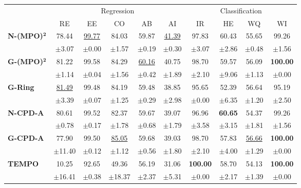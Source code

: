 \begin{table}[ht]
\centering
\small
\begin{tabular}{lccccc cccc}
\toprule
& \multicolumn{5}{c}{Regression}
& \multicolumn{4}{c}{Classification} \\
\cmidrule(r{0.7em}){1-6}
\cmidrule(l{0.7em}){7-10}
& RE & EE & CO & AB & AI & IR & HE & WQ & WI \\
\textbf{N-(MPO)}$\bm{^2}$ & 78.44 & \underline{99.77} & 84.03 & 59.87 & \underline{41.39} & 97.83 & 60.43 & 55.65 & 99.26 \\
 & $\pm$3.07 & $\pm$0.00 & $\pm$1.57 & $\pm$0.19 & $\pm$0.30 & $\pm$3.07 & $\pm$2.86 & $\pm$0.48 & $\pm$1.56 \\
\cmidrule(r{0.7em}){1-6} \cmidrule(l{0.7em}){7-10}
\textbf{G-(MPO)}$\bm{^2}$ & 81.22 & 99.58 & 84.29 & \underline{60.16} & 40.75 & 98.70 & 59.57 & 56.09 & \textbf{100.00} \\
 & $\pm$1.14 & $\pm$0.04 & $\pm$1.56 & $\pm$0.42 & $\pm$1.89 & $\pm$2.10 & $\pm$9.06 & $\pm$1.13 & $\pm$0.00 \\
\cmidrule(r{0.7em}){1-6} \cmidrule(l{0.7em}){7-10}
\textbf{G-Ring} & \underline{81.49} & 99.48 & 84.19 & 59.48 & 38.85 & 95.65 & 52.39 & 56.64 & 95.19 \\
 & $\pm$3.39 & $\pm$0.07 & $\pm$1.25 & $\pm$0.29 & $\pm$2.98 & $\pm$0.00 & $\pm$6.35 & $\pm$1.20 & $\pm$2.50 \\
\cmidrule(r{0.7em}){1-6} \cmidrule(l{0.7em}){7-10}
\cmidrule(r{0.7em}){1-6} \cmidrule(l{0.7em}){7-10}
\textbf{N-CPD-A} & 80.61 & 99.52 & 82.37 & 59.67 & 39.07 & 96.96 & \textbf{60.65} & 54.37 & 99.26 \\
 & $\pm$0.78 & $\pm$0.17 & $\pm$1.78 & $\pm$0.68 & $\pm$1.79 & $\pm$3.58 & $\pm$3.15 & $\pm$1.81 & $\pm$1.56 \\
\cmidrule(r{0.7em}){1-6} \cmidrule(l{0.7em}){7-10}
\textbf{G-CPD-A} & 77.90 & 99.50 & \underline{85.05} & 59.68 & 39.03 & 98.70 & 57.83 & \underline{56.66} & \textbf{100.00} \\
 & $\pm$11.40 & $\pm$0.12 & $\pm$1.12 & $\pm$0.56 & $\pm$1.80 & $\pm$2.10 & $\pm$4.00 & $\pm$1.29 & $\pm$0.00 \\
\cmidrule(r{0.7em}){1-6} \cmidrule(l{0.7em}){7-10}
\textbf{TEMPO} & 10.25 & 92.65 & 49.36 & 56.19 & 31.06 & \textbf{100.00} & 58.70 & 54.13 & \textbf{100.00} \\
 & $\pm$16.41 & $\pm$0.38 & $\pm$18.37 & $\pm$2.37 & $\pm$5.31 & $\pm$0.00 & $\pm$2.17 & $\pm$1.39 & $\pm$0.00 \\
\cmidrule(r{0.7em}){1-6} \cmidrule(l{0.7em}){7-10}

\end{tabular}
\end{table}
